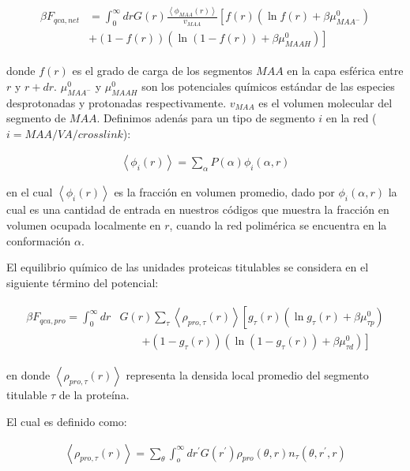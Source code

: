 \begin{align}
	\begin{aligned}
		\beta F_{qca,net} &= \int_0^\infty drG(r) \frac{\left<\phi_{MAA}(r)\right>}{v_{MAA}} \left[f(r)(\ln f(r)+ \beta\mu^0_{MAA^-})\right.\\
		&\left.+(1-f(r))(\ln (1-f(r))+\beta\mu^0_{MAAH})\right]    
	\end{aligned}
\end{align} 


\noindent donde $f(r)$ es el grado de carga de los segmentos $MAA$ en la capa esf\'erica entre $r$ y $r + dr$.
$\mu^0_{MAA^-}$ y $\mu^0_{MAAH}$ son los potenciales qu\'imicos est\'andar de las especies desprotonadas y protonadas respectivamente. $v_{MAA}$ es el volumen molecular del segmento de $MAA$.
Definimos aden\'as para un tipo de segmento $i$ en la red ($i = MAA/VA/crosslink$):
 

\begin{align}
	\left< \phi_i(r)\right> = \sum_\alpha{P(\alpha)\phi_i(\alpha,r)}
	\label{eq:esf:ensamble-gel}
\end{align}

\noindent en el cual $\left< \phi_i(r)\right> $ es la fracci\'on en volumen promedio, dado por $\phi_i(\alpha,r)$ la cual es una cantidad de entrada en nuestros c\'odigos que muestra la fracci\'on en volumen ocupada localmente en $r$, cuando la red polim\'erica se encuentra en la conformaci\'on $\alpha$.


El equilibrio qu\'imico de las unidades proteicas titulables se considera en el siguiente t\'ermino del potencial:

\begin{align}
	\begin{aligned}
		\beta F_{qca,pro} =\int_0^\infty dr &G(r) \sum_\tau \left<\rho_{pro,\tau}(r)\right> \left[g_\tau(r)(\ln g_\tau(r)+ \beta\mu^0_{\tau p})\right.\\
		&\qquad\left.+(1-g_\tau(r))(\ln (1-g_\tau(r))+\beta\mu^0_{\tau d})\right]   
	\end{aligned}
\end{align} 

\noindent en donde $\left<\rho_{pro,\tau}(r)\right>$ representa la densida local promedio del segmento titulable $\tau$ de la prote\'ina.

El cual es definido como:

\begin{align}
	\left<\rho_{pro,\tau}(r)\right> = \sum_\theta \int_o^\infty dr^\prime G(r^\prime) \rho_{pro}(\theta,r)n_\tau(\theta,r^\prime,r)
	\label{eq:esf:segments-pro}
\end{align}

